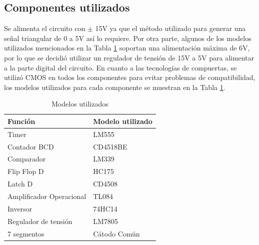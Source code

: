\documentclass[11pt, a4paper]{article}
\begin{document}
\subsection{Componentes utilizados}
Se alimenta el circuito con $\pm$ 15V ya que el m\'etodo utilizado para generar una señal triangular de 0 a 5V as\'i lo requiere. Por otra parte, algunos de los modelos utilizados mencionados en la Tabla \ref{tab:modelos_utilizados} soportan una alimentaci\'on m\'axima de 6V, por lo que se decidi\'o utilizar un regulador de tensi\'on de 15V a 5V para alimentar a la parte digital del circuito.\newline
En cuanto a las tecnolog\'ias de compuertas, se utiliz\'o CMOS en todos los componentes para evitar problemas de compatibilidad, los modelos utilizados para cada componente se muestran en la Tabla \ref{tab:modelos_utilizados}.
%
\begin{table}[H]
\center
\begin{tabular}{|l|l|}
\hline
\textbf{Funci\'on}         & \textbf{Modelo utilizado} \\ \hline
Timer                    & LM555                     \\ \hline
Contador BCD             & CD4518BE                  \\ \hline
Comparador               & LM339                     \\ \hline
Flip Flop D              & HC175                     \\ \hline
Latch D                  & CD4508                    \\ \hline
Amplificador Operacional & TL084                     \\ \hline
Inversor                 & 74HC14                    \\ \hline
Regulador de tensi\'on     & LM7805                    \\ \hline
7 segmentos              & C\'atodo Com\'un              \\ \hline
\end{tabular}
\caption{Modelos utilizados}
\label{tab:modelos_utilizados}
\end{table}
\end{document}
